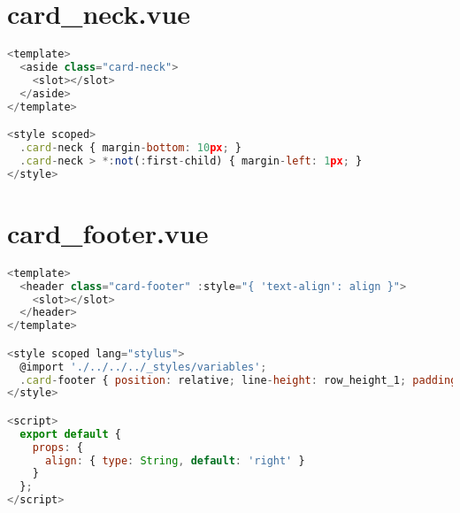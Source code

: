 \section{card\_neck.vue}


\begin{lstlisting}[language=JavaScript]
<template>
  <aside class="card-neck">
    <slot></slot>
  </aside>
</template>

<style scoped>
  .card-neck { margin-bottom: 10px; }
  .card-neck > *:not(:first-child) { margin-left: 1px; }
</style>
\end{lstlisting}


\section{card\_footer.vue}


\begin{lstlisting}[language=JavaScript]
<template>
  <header class="card-footer" :style="{ 'text-align': align }">
    <slot></slot>
  </header>
</template>

<style scoped lang="stylus">
  @import './../../../_styles/variables';
  .card-footer { position: relative; line-height: row_height_1; padding: 2px 0 5px; border-top: 1px solid light_gray_1; margin-top: 10px; }
</style>

<script>
  export default {
    props: {
      align: { type: String, default: 'right' }
    }
  };
</script>
\end{lstlisting}



\begin{lstlisting}[language=JavaScript]

\end{lstlisting}



\begin{lstlisting}[language=JavaScript]

\end{lstlisting}




\begin{lstlisting}[language=JavaScript]

\end{lstlisting}



\begin{lstlisting}[language=JavaScript]

\end{lstlisting}



